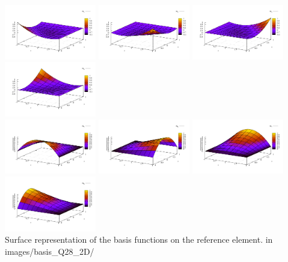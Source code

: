 \begin{center}
\includegraphics[width=4cm]{images/basis_Q28_2D/N1}
\includegraphics[width=4cm]{images/basis_Q28_2D/N2}
\includegraphics[width=4cm]{images/basis_Q28_2D/N3}
\includegraphics[width=4cm]{images/basis_Q28_2D/N4}\\
\includegraphics[width=4cm]{images/basis_Q28_2D/N5}
\includegraphics[width=4cm]{images/basis_Q28_2D/N6}
\includegraphics[width=4cm]{images/basis_Q28_2D/N7}
\includegraphics[width=4cm]{images/basis_Q28_2D/N8}\\
{\captionfont Surface representation of the basis functions on the reference element.
{\color{gray} in images/basis\_Q28\_2D/ }}
\end{center}



